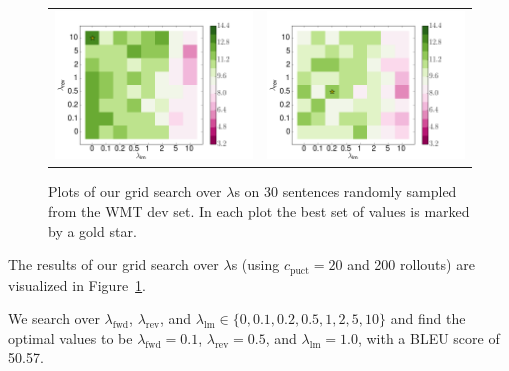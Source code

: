 \documentclass[11pt,a4paper]{article}
\begin{document}
\begin{figure}
\begin{tabular}{c c}
\includegraphics[scale=0.36]{wmt0_5.png} & \includegraphics[scale=0.36]{wmt10.png} \\
\end{tabular}
\caption{Plots of our grid search over $\lambda$s on 30 sentences randomly sampled from the WMT dev set. In each plot the best set of values is marked by a gold star.}
\label{fig:grid_search}
\end{figure}

The results of our grid search over $\lambda$s (using $c_\text{puct}=20$ and 200 rollouts) are visualized in Figure~\ref{fig:grid_search}.

We search over $\lambda_{\text{fwd}}$, $\lambda_{\text{rev}}$, and $\lambda_{\text{lm}} \in \{0, 0.1, 0.2, 0.5, 1, 2, 5, 10\}$
and find the optimal values to be $\lambda_\text{fwd}=0.1$, $\lambda_\text{rev}=0.5$, and $\lambda_\text{lm}=1.0$, with a BLEU score of 50.57.
\end{document}
